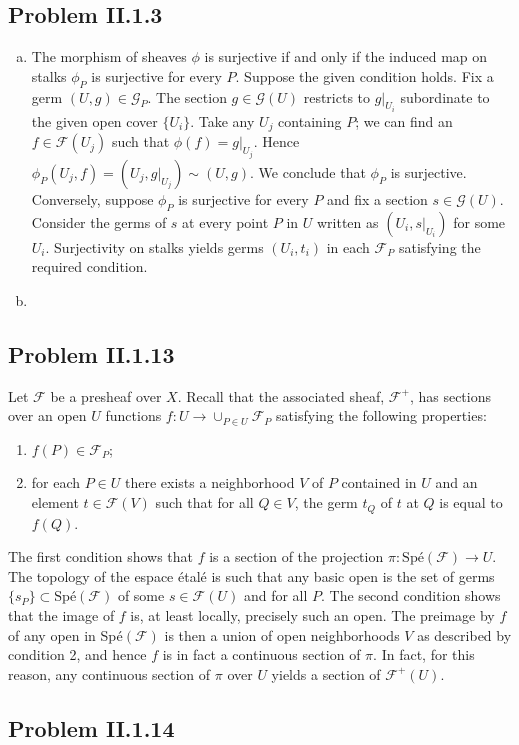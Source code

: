 \documentclass{mathnotes}
\begin{document}
\subsection*{Problem II.1.3}
\begin{enumerate}[(a)]
    \item The morphism of sheaves $\phi$ is surjective if and only if the induced map on stalks $\phi_P$ is surjective for every $P$.
        Suppose the given condition holds. Fix a germ $(U,g)\in\mathcal{G}_P$. The section $g\in\mathcal{G}(U)$ restricts
        to $g|_{U_i}$ subordinate to the given open cover $\{U_i\}$. Take any $U_j$ containing $P$; we can find an $f\in\mathcal{F}(U_j)$
        such that $\phi(f)=g|_{U_j}$. Hence $\phi_P(U_j,f)=(U_j,g|_{U_j})\sim(U,g)$. We conclude that $\phi_P$ is surjective.
        Conversely, suppose $\phi_P$ is surjective for every $P$ and fix a section $s\in\mathcal{G}(U)$. Consider the germs
        of $s$ at every point $P$ in $U$ written as $(U_i,s|_{U_i})$ for some $U_i$. Surjectivity on stalks yields germs
        $(U_i,t_i)$ in each $\mathcal{F}_P$ satisfying the required condition.
    \item 
\end{enumerate}

\subsection*{Problem II.1.13}
Let $\mathcal{F}$ be a presheaf over $X$. Recall that the associated sheaf, $\mathcal{F}^+$, has sections over an open $U$
functions $f:U\to\cup_{P\in U}\mathcal{F}_P$ satisfying the following properties:
\begin{enumerate}
    \item $f(P)\in\mathcal{F}_P$;
    \item for each $P\in U$ there exists a neighborhood $V$ of $P$ contained in $U$ and an element
        $t\in\mathcal{F}(V)$ such that for all $Q\in V$, the germ $t_Q$ of $t$ at $Q$ is equal to $f(Q)$.
\end{enumerate}
The first condition shows that $f$ is a section of the projection $\pi:\text{Sp\'e}(\mathcal{F})\to U$. The topology
of the espace \'etal\'e is such that any basic open is the set of germs $\{s_P\}\subset\text{Sp\'e}(\mathcal{F})$ of some $s\in\mathcal{F}(U)$
and for all $P$. The second condition shows that the image of $f$ is, at least locally, precisely such an open.
The preimage by $f$ of any open in Sp\'e$(\mathcal{F})$ is then a union of open neighborhoods $V$ as described by condition 2,
and hence $f$ is in fact a continuous section of $\pi$. In fact, for this reason, any continuous section of $\pi$ 
over $U$ yields a section of $\mathcal{F}^+(U)$.


\subsection*{Problem II.1.14}
\end{document}

